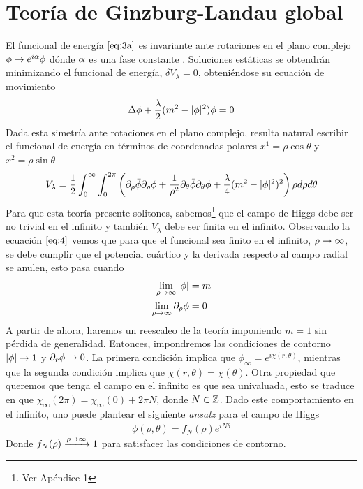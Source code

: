 \section{Teoría de Ginzburg-Landau global}
\label{sec:1.3}

El funcional de energía $\eqref{eq:3a}$ es invariante ante rotaciones en el plano complejo $\phi\rightarrow e^{i\alpha}\phi$ dónde $\alpha$ es una fase constante . Soluciones estáticas se obtendrán minimizando el funcional de energía, $\delta V_\lambda=0$, obteniéndose su ecuación de movimiento
\begin{align}
    \Delta\phi+\frac{\lambda}{2}(m^2-|\phi|^2)\phi=0 \label{eq:3}
\end{align}
Dada esta simetría ante rotaciones en el plano complejo, resulta natural escribir el funcional de energía en términos de coordenadas polares $x^1=\rho\cos\theta$ y $x^2=\rho\sin\theta$
\begin{align}
    V_\lambda = \frac{1}{2}\int_0^\infty\int_0^{2\pi}\left(\partial_\rho\bar\phi\partial_\rho\phi+\frac{1}{\rho^2}\partial_\theta\bar\phi\partial_\theta\phi+\frac{\lambda}{4}(m^2-|\phi|^2)^2\right)\rho d\rho d\theta \label{eq:4}
\end{align}
Para que esta teoría presente solitones, sabemos\footnote{Ver Apéndice 1} que el campo de Higgs debe ser no trivial en el infinito y también $V_\lambda$ debe ser finita en el infinito. Observando la ecuación $\eqref{eq:4}$ vemos que para que el funcional sea finito en el infinito, $\rho\rightarrow\infty$, se debe cumplir que el potencial cuártico y la derivada respecto al campo radial se anulen, esto pasa cuando
\begin{align}
    \lim_{\rho\rightarrow\infty} |\phi| &= m \label{eq:5}\\
    \lim_{\rho\rightarrow\infty} \partial_\rho\phi &= 0 \label{eq:6}
\end{align}
A partir de ahora, haremos un reescaleo de la teoría imponiendo $m=1$ sin pérdida de generalidad. Entonces, impondremos las condiciones de contorno $|\phi|\rightarrow 1$ y $\partial_r\phi\rightarrow 0$. La primera condición implica que $\phi_\infty = e^{i\chi(r,\theta)}$, mientras que la segunda condición implica que $\chi(r,\theta)=\chi(\theta)$. Otra propiedad que queremos que tenga el campo en el infinito es que sea univaluada, esto se traduce en que $\chi_\infty(2\pi)=\chi_\infty(0)+2\pi N$, donde $N\in\mathbb{Z}$. Dado este comportamiento en el infinito, uno puede plantear el siguiente \emph{ansatz} para el campo de Higgs
\begin{align}
    \phi(\rho,\theta) = f_N(\rho)e^{iN\theta} \label{eq:7}
\end{align}
Donde $f_N(\rho)\xrightarrow{\rho\rightarrow\infty} 1$ para satisfacer las condiciones de contorno.

